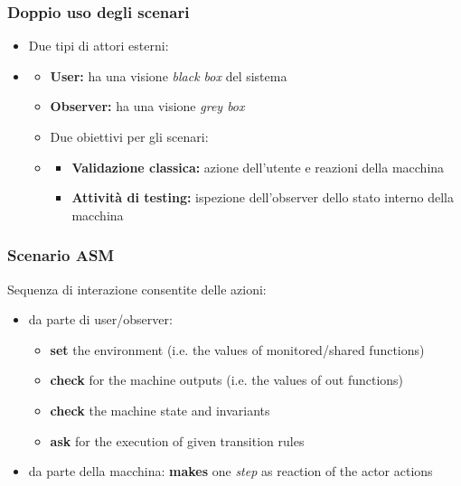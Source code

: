 \documentclass{report}
\begin{document}
\subsubsection{Doppio uso degli scenari}
\begin{itemize}
    \item Due tipi di attori esterni:
    \item \begin{itemize}
        \item \textbf{User:} ha una visione \textit{black box} del sistema
        \item \textbf{Observer:} ha una visione \textit{grey box}
    \item Due obiettivi per gli scenari:
    \item \begin{itemize}
        \item \textbf{Validazione classica:} azione dell'utente e reazioni della macchina
        \item \textbf{Attività di testing:} ispezione dell’observer dello stato interno
        della macchina
    \end{itemize}
    \end{itemize}
\end{itemize}

\subsubsection{Scenario ASM}
Sequenza di interazione consentite delle azioni:
\begin{itemize}
    \item da parte di user/observer: 
    \begin{itemize}
        \item \textbf{set} the environment (i.e. the values of
        monitored/shared functions)
        \item \textbf{check} for the machine outputs (i.e. the values of
        out functions)
        \item \textbf{check} the machine state and invariants
        \item \textbf{ask} for the execution of given transition rules
    \end{itemize}
    \item da parte della macchina: 
    \textbf{makes} one \textit{step} as reaction of the actor actions
\end{itemize}
\end{document}
